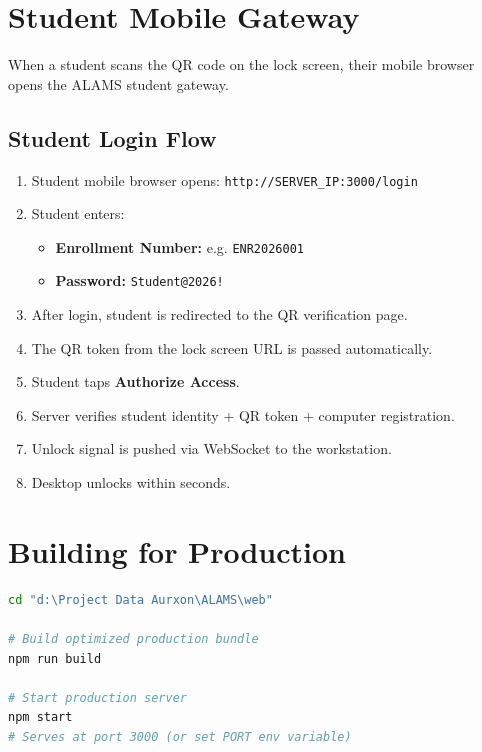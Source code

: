 \section{Student Mobile Gateway}

When a student scans the QR code on the lock screen, their mobile browser opens the ALAMS student gateway.

\subsection{Student Login Flow}

\begin{enumerate}[leftmargin=*, label=\textbf{Step \arabic*.}]
  \item Student mobile browser opens: \texttt{http://SERVER\_IP:3000/login}
  \item Student enters:
    \begin{itemize}
      \item \textbf{Enrollment Number:} e.g. \texttt{ENR2026001}
      \item \textbf{Password:} \texttt{Student@2026!}
    \end{itemize}
  \item After login, student is redirected to the QR verification page.
  \item The QR token from the lock screen URL is passed automatically.
  \item Student taps \textbf{Authorize Access}.
  \item Server verifies student identity + QR token + computer registration.
  \item Unlock signal is pushed via WebSocket to the workstation.
  \item Desktop unlocks within seconds.
\end{enumerate}

\section{Building for Production}

\begin{tcolorbox}[codebox, title={Production Build}]
\begin{lstlisting}[language=bash]
cd "d:\Project Data Aurxon\ALAMS\web"

# Build optimized production bundle
npm run build

# Start production server
npm start
# Serves at port 3000 (or set PORT env variable)
\end{lstlisting}
\end{tcolorbox}
